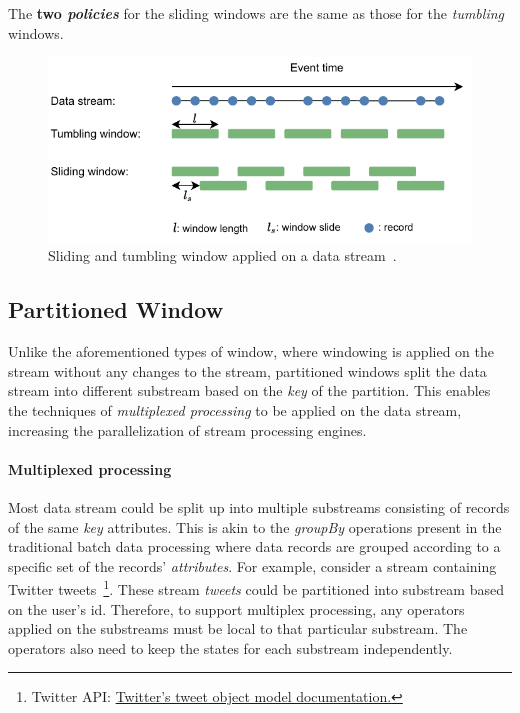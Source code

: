 The \textbf{two \emph{policies}} for the sliding windows are the same as those for the \emph{tumbling} windows. 

\begin{figure}[htpb]
    \centering
    \includegraphics[width=0.8\linewidth]{fig/slide_tumb_windows.pdf}
    \caption{Sliding and tumbling window applied on a data stream~\cite{jonas_scotty}. }%
    \label{fig:slide_tumb_window}
\end{figure}


\subsection{Partitioned Window}%
\label{sec:Partitioned Window}

Unlike the aforementioned types of window, where windowing is applied on the stream 
without any changes to the stream, partitioned windows split the data stream into 
different substream based on the \emph{key} of the partition. This enables the 
techniques of \emph{multiplexed processing} to be applied on the data stream, increasing 
the parallelization of stream processing engines. 

\paragraph{Multiplexed processing}%
\label{par:Multiplexed processing}
Most data stream could be split up into multiple substreams consisting of records 
of the same \emph{key} attributes. This is akin to 
the \emph{groupBy} operations present in the traditional batch data processing where 
data records are grouped according to a specific set of the records' \emph{attributes}.
For example, consider a stream containing 
Twitter tweets~\footnote{Twitter API: \href{https://developer.twitter.com/en/docs/twitter-api/v1/data-dictionary/object-model/tweet}
{Twitter's tweet object model documentation.}}. These stream \emph{tweets} could be 
partitioned into substream based on the user's id. 
Therefore, to support multiplex processing, any operators applied on the substreams 
must be local to that particular substream. The operators also need to keep the states for each 
substream independently. 


